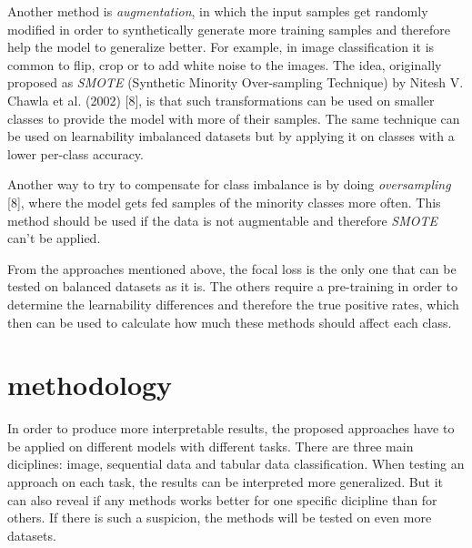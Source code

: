 \documentclass[journal]{IEEEtran}
\begin{document}
Another method is \emph{augmentation}, in which the input samples get randomly modified in order to synthetically generate more training samples and therefore help the model to generalize better. 
For example, in image classification it is common to flip, crop or to add white noise to the images. 
The idea, originally proposed as \emph{SMOTE} (Synthetic Minority Over-sampling Technique) by Nitesh V. Chawla et al. (2002) [8], is that such transformations can be used on smaller classes to provide the model with more of their samples.
The same technique can be used on learnability imbalanced datasets but by applying it on classes with a lower per-class accuracy.


Another way to try to compensate for class imbalance is by doing \emph{oversampling} [8], where the model gets fed samples of the minority classes more often.
This method should be used if the data is not augmentable and therefore \emph{SMOTE} can't be applied.


From the approaches mentioned above, the focal loss is the only one that can be tested on balanced datasets as it is. 
The others require a pre-training in order to determine the learnability differences and therefore the true positive rates, which then can be used to calculate how much these methods should affect each class.

\section{methodology}
In order to produce more interpretable results, the proposed approaches have to be applied on different models with different tasks. 
There are three main diciplines: image, sequential data and tabular data classification. 
When testing an approach on each task, the results can be interpreted more generalized. 
But it can also reveal if any methods works better for one specific dicipline than for others. 
If there is such a suspicion, the methods will be tested on even more datasets.
\end{document}
